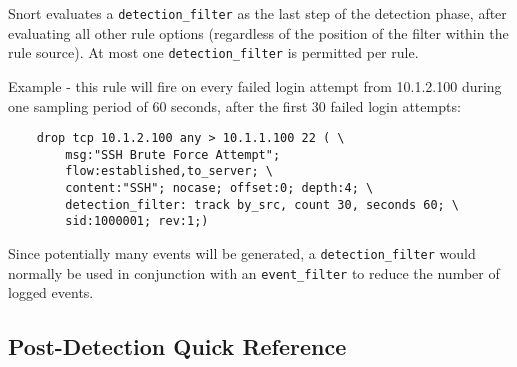 \documentclass[english]{report}
\begin{document}
Snort evaluates a \texttt{detection\_filter} as the last step of the detection
phase, after evaluating all other rule options (regardless of the position of
the filter within the rule source).  At most one \texttt{detection\_filter} is
permitted per rule.

Example - this rule will fire on every failed login attempt from 10.1.2.100
during one sampling period of 60 seconds, after the first 30 failed login
attempts:

\begin{verbatim}
    drop tcp 10.1.2.100 any > 10.1.1.100 22 ( \
        msg:"SSH Brute Force Attempt";
        flow:established,to_server; \
        content:"SSH"; nocase; offset:0; depth:4; \
        detection_filter: track by_src, count 30, seconds 60; \
        sid:1000001; rev:1;)
\end{verbatim}

Since potentially many events will be generated, a \texttt{detection\_filter}
would normally be used in conjunction with an \texttt{event\_filter} to reduce
the number of logged events.

\subsection{Post-Detection Quick Reference}
\end{document}
